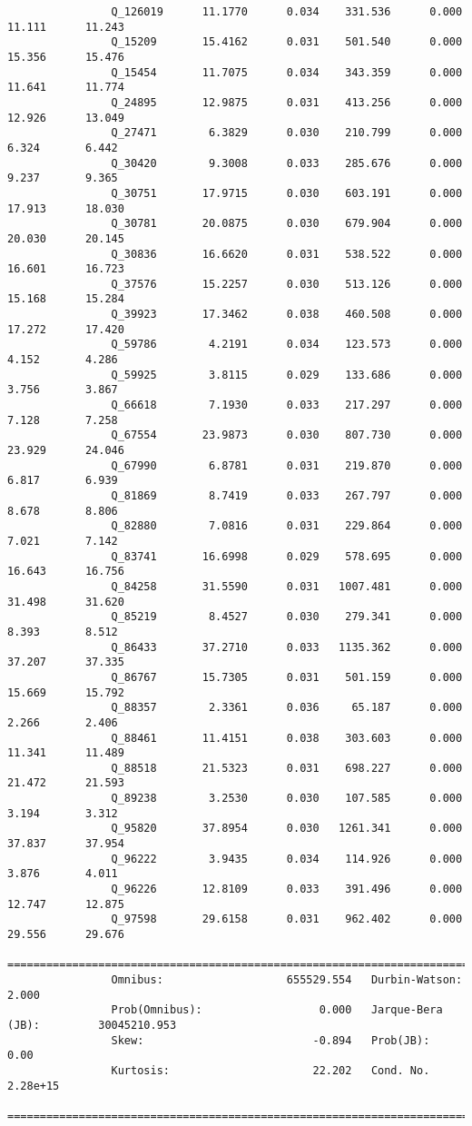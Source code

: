 \documentclass[
	article,			%
	11pt,				%
	oneside,			%
	a4paper,			%
	english,			%
	brazil,				%
	sumario=tradicional
]{abntex2}
\begin{document}
\begin{verbatim}
				Q_126019      11.1770      0.034    331.536      0.000      11.111      11.243
				Q_15209       15.4162      0.031    501.540      0.000      15.356      15.476
				Q_15454       11.7075      0.034    343.359      0.000      11.641      11.774
				Q_24895       12.9875      0.031    413.256      0.000      12.926      13.049
				Q_27471        6.3829      0.030    210.799      0.000       6.324       6.442
				Q_30420        9.3008      0.033    285.676      0.000       9.237       9.365
				Q_30751       17.9715      0.030    603.191      0.000      17.913      18.030
				Q_30781       20.0875      0.030    679.904      0.000      20.030      20.145
				Q_30836       16.6620      0.031    538.522      0.000      16.601      16.723
				Q_37576       15.2257      0.030    513.126      0.000      15.168      15.284
				Q_39923       17.3462      0.038    460.508      0.000      17.272      17.420
				Q_59786        4.2191      0.034    123.573      0.000       4.152       4.286
				Q_59925        3.8115      0.029    133.686      0.000       3.756       3.867
				Q_66618        7.1930      0.033    217.297      0.000       7.128       7.258
				Q_67554       23.9873      0.030    807.730      0.000      23.929      24.046
				Q_67990        6.8781      0.031    219.870      0.000       6.817       6.939
				Q_81869        8.7419      0.033    267.797      0.000       8.678       8.806
				Q_82880        7.0816      0.031    229.864      0.000       7.021       7.142
				Q_83741       16.6998      0.029    578.695      0.000      16.643      16.756
				Q_84258       31.5590      0.031   1007.481      0.000      31.498      31.620
				Q_85219        8.4527      0.030    279.341      0.000       8.393       8.512
				Q_86433       37.2710      0.033   1135.362      0.000      37.207      37.335
				Q_86767       15.7305      0.031    501.159      0.000      15.669      15.792
				Q_88357        2.3361      0.036     65.187      0.000       2.266       2.406
				Q_88461       11.4151      0.038    303.603      0.000      11.341      11.489
				Q_88518       21.5323      0.031    698.227      0.000      21.472      21.593
				Q_89238        3.2530      0.030    107.585      0.000       3.194       3.312
				Q_95820       37.8954      0.030   1261.341      0.000      37.837      37.954
				Q_96222        3.9435      0.034    114.926      0.000       3.876       4.011
				Q_96226       12.8109      0.033    391.496      0.000      12.747      12.875
				Q_97598       29.6158      0.031    962.402      0.000      29.556      29.676
				==============================================================================
				Omnibus:                   655529.554   Durbin-Watson:                   2.000
				Prob(Omnibus):                  0.000   Jarque-Bera (JB):         30045210.953
				Skew:                          -0.894   Prob(JB):                         0.00
				Kurtosis:                      22.202   Cond. No.                     2.28e+15
				==============================================================================
				

\end{verbatim}
\end{document}
